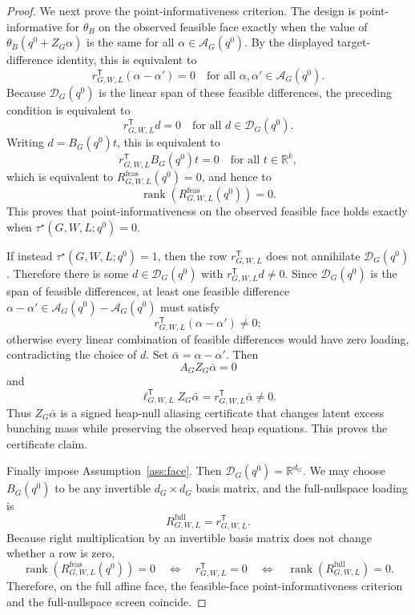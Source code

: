 \documentclass[11pt]{article}
\newcommand{\transpose}{\mathsf{T}}
\theoremstyle{definition}
\theoremstyle{plain}
\theoremstyle{remark}
\begin{document}
\begin{proof}
We next prove the point-informativeness criterion.  The design is point-informative for \(\theta_B\) on the observed feasible face exactly when the value of \(\theta_B(q^0+Z_G\alpha)\) is the same for all \(\alpha\in\mathcal{A}_G(q^0)\).  By the displayed target-difference identity, this is equivalent to
\[
r_{G,W,L}^{\transpose}(\alpha-\alpha')=0
\quad\text{for all }\alpha,\alpha'\in\mathcal{A}_G(q^0).
\]
Because \(\mathcal{D}_G(q^0)\) is the linear span of these feasible differences, the preceding condition is equivalent to
\[
r_{G,W,L}^{\transpose}d=0
\quad\text{for all }d\in\mathcal{D}_G(q^0).
\]
Writing \(d=B_G(q^0)t\), this is equivalent to
\[
r_{G,W,L}^{\transpose}B_G(q^0)t=0
\quad\text{for all }t\in\mathbb{R}^k,
\]
which is equivalent to \(R^{\mathrm{feas}}_{G,W,L}(q^0)=0\), and hence to
\[
\operatorname{rank}(R^{\mathrm{feas}}_{G,W,L}(q^0))=0.
\]
This proves that point-informativeness on the observed feasible face holds exactly when \(\tau^\star(G,W,L;q^0)=0\).

If instead \(\tau^\star(G,W,L;q^0)=1\), then the row \(r_{G,W,L}^{\transpose}\) does not annihilate \(\mathcal{D}_G(q^0)\).  Therefore there is some \(d\in\mathcal{D}_G(q^0)\) with \(r_{G,W,L}^{\transpose}d\ne0\).  Since \(\mathcal{D}_G(q^0)\) is the span of feasible differences, at least one feasible difference \(\alpha-\alpha'\in\mathcal{A}_G(q^0)-\mathcal{A}_G(q^0)\) must satisfy
\[
r_{G,W,L}^{\transpose}(\alpha-\alpha')\ne0;
\]
otherwise every linear combination of feasible differences would have zero loading, contradicting the choice of \(d\).  Set \(\bar\alpha=\alpha-\alpha'\).  Then
\[
A_GZ_G\bar\alpha=0
\]
and
\[
\ell_{G,W,L}^{\transpose}Z_G\bar\alpha
=r_{G,W,L}^{\transpose}\bar\alpha\ne0.
\]
Thus \(Z_G\bar\alpha\) is a signed heap-null aliasing certificate that changes latent excess bunching mass while preserving the observed heap equations.  This proves the certificate claim.

Finally impose Assumption~\ref{ass:face}.  Then \(\mathcal{D}_G(q^0)=\mathbb{R}^{d_G}\).  We may choose \(B_G(q^0)\) to be any invertible \(d_G\times d_G\) basis matrix, and the full-nullspace loading is
\[
R^{\mathrm{full}}_{G,W,L}=r_{G,W,L}^{\transpose}.
\]
Because right multiplication by an invertible basis matrix does not change whether a row is zero,
\[
\operatorname{rank}(R^{\mathrm{feas}}_{G,W,L}(q^0))=0
\quad\Longleftrightarrow\quad
r_{G,W,L}^{\transpose}=0
\quad\Longleftrightarrow\quad
\operatorname{rank}(R^{\mathrm{full}}_{G,W,L})=0.
\]
Therefore, on the full affine face, the feasible-face point-informativeness criterion and the full-nullspace screen coincide.
\end{proof}
\end{document}
